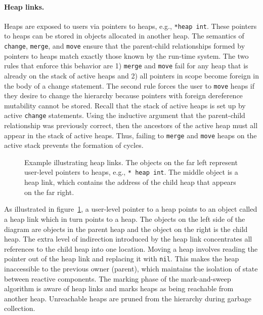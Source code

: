 \paragraph{Heap links.}
Heaps are exposed to users via pointers to heaps, e.g., \verb+*heap int+.
These pointers to heaps can be stored in objects allocated in another heap.
The semantics of \verb+change+, \verb+merge+, and \verb+move+ ensure that the parent-child relationships formed by pointers to heaps match exactly those known by the run-time system.
The two rules that enforce this behavior are 1) \verb+merge+ and \verb+move+ fail for any heap that is already on the stack of active heaps and 2) all pointers in scope become foreign in the body of a change statement.
The second rule forces the user to \verb+move+ heaps if they desire to change the hierarchy because pointers with foreign dereference mutability cannot be stored.
Recall that the stack of active heaps is set up by active \verb+change+ statements.
Using the inductive argument that the parent-child relationship was previously correct, then the ancestors of the active heap must all appear in the stack of active heaps.
Thus, failing to \verb+merge+ and \verb+move+ heaps on the active stack prevents the formation of cycles.

\begin{figure}
\centering
\cprotect\caption{Example illustrating heap links\label{heap_link}.  The objects on the far left represent user-level pointers to heaps, e.g., \verb+* heap int+.  The middle object is a heap link, which contains the address of the child heap that appears on the far right.}
\end{figure}

As illustrated in figure~\ref{heap_link}, a user-level pointer to a heap points to an object called a heap link which in turn points to a heap.
The objects on the left side of the diagram are objects in the parent heap and the object on the right is the child heap.
The extra level of indirection introduced by the heap link concentrates all references to the child heap into one location.
Moving a heap involves reading the pointer out of the heap link and replacing it with \verb+nil+.
This makes the heap inaccessible to the previous owner (parent), which maintains the isolation of state between reactive components.
The marking phase of the mark-and-sweep algorithm is aware of heap links and marks heaps as being reachable from another heap.
Unreachable heaps are pruned from the hierarchy during garbage collection.

